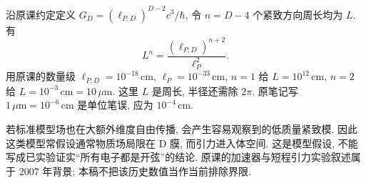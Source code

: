 沿原课约定定义 $G_D=(\ell_{P,D})^{D-2}c^3/\hbar$, 令 $n=D-4$ 个紧致方向周长均为 $L$. 有
\[
 L^n=\frac{(\ell_{P,D})^{n+2}}{\ell_P^2}.
\]
用原课的数量级 $\ell_{P,D}=10^{-18}\,\mathrm{cm}$,
$\ell_P=10^{-33}\,\mathrm{cm}$, $n=1$ 给 $L=10^{12}\,\mathrm{cm}$, $n=2$ 给 $L=10^{-3}\,\mathrm{cm}=10\,\mu\mathrm m$. 这里 $L$ 是周长, 半径还需除 $2\pi$. 原笔记写 $1\,\mu\mathrm m=10^{-6}\,\mathrm{cm}$ 是单位笔误, 应为 $10^{-4}\,\mathrm{cm}$.

若标准模型场也在大额外维度自由传播, 会产生容易观察到的低质量紧致模. 因此这类模型常假设通常物质场局限在 D 膜, 而引力进入体空间. 这是模型假设, 不能写成已实验证实“所有电子都是开弦”的结论. 原课的加速器与短程引力实验叙述属于 2007 年背景; 本稿不把该历史数值当作当前排除界限.
